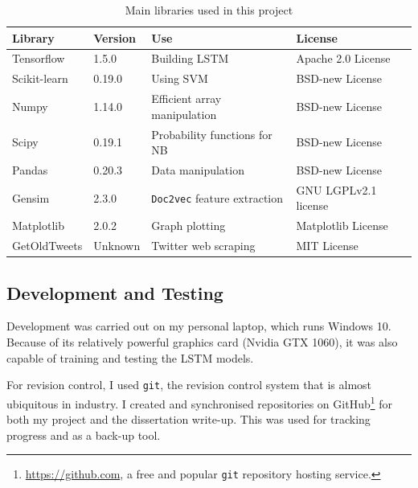 \documentclass[12pt,a4paper,twoside,openright]{report}
\begin{document}
\begin{table}[H]
\centering
\begin{tabular}{llll}
\toprule
\textbf{Library}                        & \textbf{Version} & \textbf{Use} & \textbf{License} \\ \midrule
Tensorflow                             & 1.5.0            & Building LSTM        & Apache 2.0 License              \\ [0.5ex]
Scikit-learn                           & 0.19.0           & Using SVM        & BSD-new License              \\ [0.5ex]
Numpy                                  & 1.14.0           & Efficient array manipulation        & BSD-new License              \\ [0.5ex]
Scipy                                  & 0.19.1           & Probability functions for NB        & BSD-new License              \\ [0.5ex]
Pandas                                 & 0.20.3           & Data manipulation        & BSD-new License              \\ [0.5ex]
Gensim								   & 2.3.0			  &	\texttt{Doc2vec} feature extraction			& GNU LGPLv2.1 license\\ [0.5ex]
Matplotlib							   & 2.0.2			  & Graph plotting 				& Matplotlib License	\\ [0.5ex]
GetOldTweets                           & Unknown          & Twitter web scraping        & MIT License              \\ [0.5ex] \bottomrule
\end{tabular}
\caption{Main libraries used in this project}
\label{table:libs}
\end{table}

\subsection{Development and Testing}

Development was carried out on my personal laptop, which runs Windows 10. Because of its relatively 
powerful graphics card (Nvidia GTX 1060), it was also capable of training and testing the LSTM
models.

For revision control, I used \texttt{git}, the revision control system
that is almost ubiquitous in industry. I created and synchronised repositories on
GitHub\footnote{\url{https://github.com}, a free and popular \texttt{git} repository hosting service.}
for both my project and the dissertation write-up. This was used for
tracking progress and as a back-up tool. 
\end{document}
